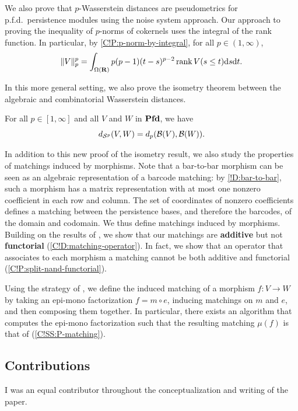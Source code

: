We also prove that $p$-Wasserstein distances are pseudometrics for p.f.d.\ persistence modules using the noise system approach. Our approach to proving the inequality of $p$-norms of cokernels uses the integral of the rank function. In particular, by \cref{C!P:p-norm-by-integral}, for all $p \in (1, \infty)$,
\[
  \| V \|_p^p = \int_{\Omega(\mathbf{R})} p (p - 1) (t - s)^{p - 2} \operatorname{rank} V(s \leq t) \text{d}s \text{d}t.
\]

In this more general setting, we also prove the isometry theorem between the algebraic and combinatorial Wasserstein distances.

\begin{theorem}
  For all $p \in [1, \infty]$ and all $V$ and $W$ in $\operatorname{\mathbf{Pfd}}$, we have
  \[
    d_{\mathcal{S}^p}(V, W) = d_p(\mathcal{B}(V), \mathcal{B}(W)).
  \]
\end{theorem}

In addition to this new proof of the isometry result, we also study the properties of matchings induced by morphisms. Note that a bar-to-bar morphism can be seen as an algebraic representation of a barcode matching: by \cref{!D:bar-to-bar}, such a morphism has a matrix representation with at most one nonzero coefficient in each row and column. The set of coordinates of nonzero coefficients defines a matching between the persistence bases, and therefore the barcodes, of the domain and codomain. We thus define matchings induced by morphisms. Building on the results of \cite{BauerLesnick2015,GST2025}, we show that our matchings are \textbf{additive} but not \textbf{functorial} (\cref{C!D:matching-operator}). In fact, we show that an operator that associates to each morphism a matching cannot be both additive and functorial (\cref{C!P:split-nand-functorial}).

Using the strategy of \cite{BauerLesnick2015}, we define the induced matching of a morphism $f \colon V \to W$ by taking an epi-mono factorization $f = m \circ e$, inducing matchings on $m$ and $e$, and then composing them together. In particular, there exists an algorithm that computes the epi-mono factorization such that the resulting matching $\mu(f)$ is that of \cite{GST2025} (\cref{C!SS:P-matching}).

\subsection*{Contributions}

I was an equal contributor throughout the conceptualization and writing of the paper.

